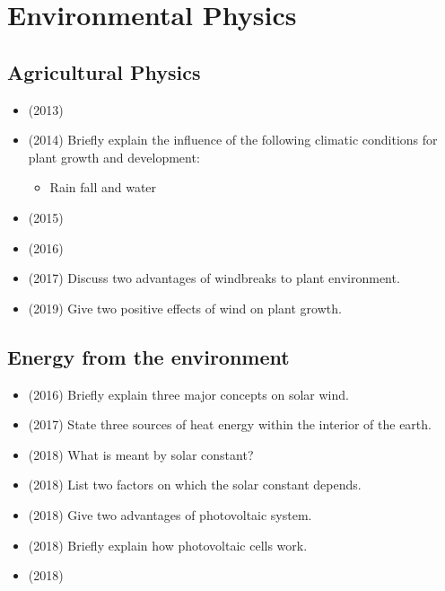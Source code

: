 \documentclass{article}
\begin{document}
\section{Environmental Physics}

\subsection{Agricultural Physics}
\begin{itemize}
\item (2013)  \item (2014)  Briefly explain the influence of the following climatic conditions for plant growth and development:\begin{itemize}
\item Rain fall and water
\end{itemize}
\item (2015)  \item (2016)  \item (2017)  Discuss two advantages of windbreaks to plant environment. 
\item (2019)  Give two positive effects of wind on plant growth.
\end{itemize}

\subsection{Energy from the environment}
\begin{itemize}
\item (2016)  Briefly explain three major concepts on solar wind.
\item (2017)  State three sources of heat energy within the interior of the earth. 
\item (2018)  What is meant by solar constant? 
\item (2018)  List two factors on which the solar constant depends. 
\item (2018)  Give two advantages of photovoltaic system. 
\item (2018)  Briefly explain how photovoltaic cells work. 
\item (2018)  \end{itemize}
\end{document}
